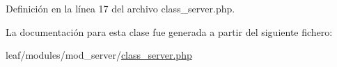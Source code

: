 Definición en la línea 17 del archivo class\-\_\-server.\-php.



La documentación para esta clase fue generada a partir del siguiente fichero\-:\begin{DoxyCompactItemize}
\item 
leaf/modules/mod\-\_\-server/\hyperlink{class__server_8php}{class\-\_\-server.\-php}\end{DoxyCompactItemize}
